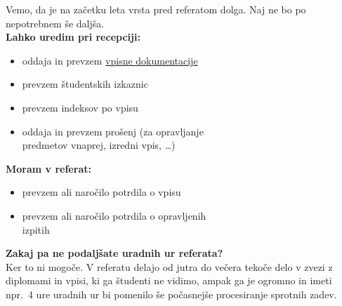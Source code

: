 \documentclass[a4paper,oneside,12pt]{article}
\title{\Title}
\author{\Author}
\date{\today}
\theoremstyle{definition}
\begin{document}
\thispagestyle{empty}  %

\fontsize{48}{48}\selectfont

Vemo, da je na začetku leta vrsta pred referatom dolga.
Naj ne bo po nepotrebnem še daljša. \\[12pt]

\fontsize{24}{24}\selectfont
\textbf{Lahko uredim pri recepciji:}
\begin{itemize}
  \item oddaja in prevzem \href{http://www.fmf.uni-lj.si/si/obvestila/39071}{vpisne
    dokumentacije}
  \item prevzem študentskih izkaznic
  \item prevzem indeksov po vpisu
  \item oddaja in prevzem prošenj (za opravljanje \\ predmetov vnaprej, izredni
    vpis, \dots)
\end{itemize}

\vspace{32pt}

\textbf{Moram v referat:}
\begin{itemize}
  \item prevzem ali naročilo potrdila o vpisu
  \item prevzem ali naročilo potrdila o opravljenih \\ izpitih
\end{itemize}

\vfill


\fontsize{18}{18}\selectfont
\textbf{Zakaj pa ne podaljšate uradnih ur referata?} \\[6pt]
Ker to ni mogoče. V referatu delajo od jutra do večera tekoče delo v zvezi z
diplomami in vpisi, ki ga študenti ne vidimo, ampak ga je ogromno in imeti npr.\
4 ure uradnih ur bi pomenilo še počasnejše procesiranje sprotnih zadev.
\end{document}
